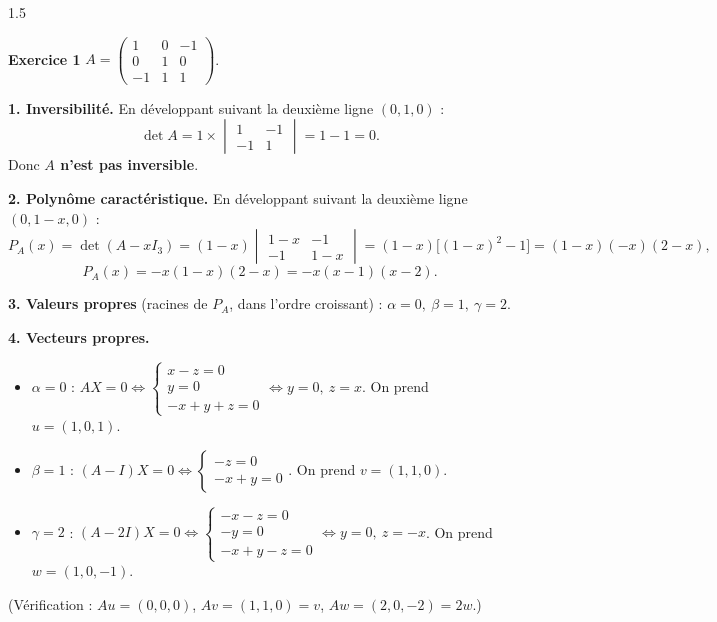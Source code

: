 \documentclass[12pt]{article}
\begin{document}
\begin{spacing}{1.5}

\textbf{Exercice 1} \quad $A=\begin{pmatrix}1&0&-1\\0&1&0\\-1&1&1\end{pmatrix}$.

\textbf{1. Inversibilité.} En développant suivant la deuxième ligne $(0,1,0)$ :
\[
\det A=1\times\begin{vmatrix}1&-1\\-1&1\end{vmatrix}=1-1=0 .
\]
Donc \textbf{$A$ n'est pas inversible}.

\textbf{2. Polynôme caractéristique.} En développant suivant la deuxième ligne $(0,1-x,0)$ :
\[
P_A(x)=\det(A-xI_3)=(1-x)\begin{vmatrix}1-x&-1\\-1&1-x\end{vmatrix}=(1-x)\big[(1-x)^2-1\big]=(1-x)(-x)(2-x),
\]
\[
\boxed{P_A(x)=-x(1-x)(2-x)=-x(x-1)(x-2)}.
\]

\textbf{3. Valeurs propres} (racines de $P_A$, dans l'ordre croissant) : $\boxed{\alpha=0,\ \beta=1,\ \gamma=2}$.

\textbf{4. Vecteurs propres.}
\begin{itemize}
\item $\alpha=0$ : $AX=0\iff\begin{cases}x-z=0\\y=0\\-x+y+z=0\end{cases}\iff y=0,\ z=x$. On prend $u=(1,0,1)$.
\item $\beta=1$ : $(A-I)X=0\iff\begin{cases}-z=0\\-x+y=0\end{cases}$. On prend $v=(1,1,0)$.
\item $\gamma=2$ : $(A-2I)X=0\iff\begin{cases}-x-z=0\\-y=0\\-x+y-z=0\end{cases}\iff y=0,\ z=-x$. On prend $w=(1,0,-1)$.
\end{itemize}
(Vérification : $Au=(0,0,0)$, $Av=(1,1,0)=v$, $Aw=(2,0,-2)=2w$.)


\end{spacing}
\end{document}
